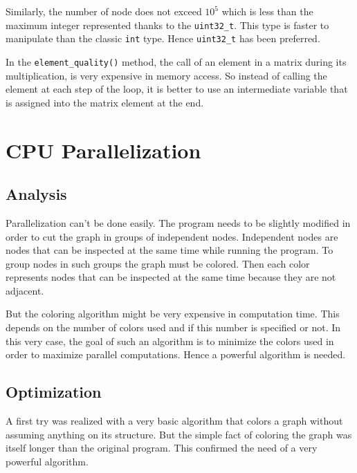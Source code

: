 \documentclass[fleqn,11pt]{SelfArx} %
\begin{document}
Similarly, the number of node does not exceed $10^5$ which is less than the maximum integer represented thanks to the \verb+uint32_t+. This type is faster to manipulate than the classic \verb+int+ type. Hence \verb+uint32_t+ has been preferred.

In the \verb+element_quality()+ method, the call of an element in a matrix during its multiplication, is very expensive in memory access. So instead of calling the element at each step of the loop, it is better to use an intermediate variable that is assigned into the matrix element at the end.


\section{CPU Parallelization}

\subsection{Analysis}

Parallelization can't be done easily. The program needs to be slightly modified in order to cut the graph in groups of independent nodes. Independent nodes are nodes that can be inspected at the same time while running the program. To group nodes in such groups the graph must be colored. Then each color represents nodes that can be inspected at the same time because they are not adjacent.

But the coloring algorithm might be very expensive in computation time. This depends on the number of colors used and if this number is specified or not. In this very case, the goal of such an algorithm is to minimize the colors used in order to maximize parallel computations. Hence a powerful algorithm is needed.

\subsection{Optimization}

A first try was realized with a very basic algorithm that colors a graph without assuming anything on its structure. But the simple fact of coloring the graph was itself longer than the original program. This confirmed the need of a very powerful algorithm.

\end{document}
